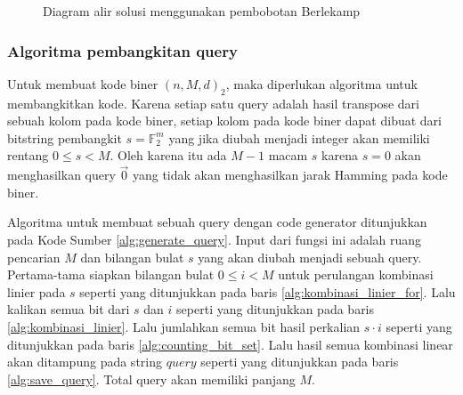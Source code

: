 \begin{figure}
\centering
{}
\caption{Diagram alir solusi menggunakan pembobotan Berlekamp}
\label{fig:flow_binarycode}
\end{figure}

\subsubsection{Algoritma pembangkitan query}

Untuk membuat kode biner $(n,M,d)_2$, maka diperlukan algoritma untuk membangkitkan kode. Karena setiap satu query adalah hasil transpose dari sebuah kolom pada kode biner, setiap kolom pada kode biner dapat dibuat dari bitstring pembangkit $s = \mathbb{F}_2^m$ yang jika diubah menjadi integer akan memiliki rentang $0 \leq s < M$. Oleh karena itu ada $M-1$ macam $s$ karena $s=0$ akan menghasilkan query $\vec{0}$ yang tidak akan menghasilkan jarak Hamming pada kode biner.

Algoritma untuk membuat sebuah query dengan code generator ditunjukkan pada Kode Sumber \ref{alg:generate_query}. Input dari fungsi ini adalah ruang pencarian $M$ dan bilangan bulat $s$ yang akan diubah menjadi sebuah query. Pertama-tama siapkan bilangan bulat $0 \leq i < M$ untuk perulangan kombinasi linier pada $s$ seperti yang ditunjukkan pada baris \ref{alg:kombinasi_linier_for}. Lalu kalikan semua bit dari $s$ dan $i$ seperti yang ditunjukkan pada baris \ref{alg:kombinasi_linier}. Lalu jumlahkan semua bit hasil perkalian $s \cdot i$ seperti yang ditunjukkan pada baris \ref{alg:counting_bit_set}. Lalu hasil semua kombinasi linear akan ditampung pada string $query$ seperti yang ditunjukkan pada baris \ref{alg:save_query}. Total query akan memiliki panjang $M$.

